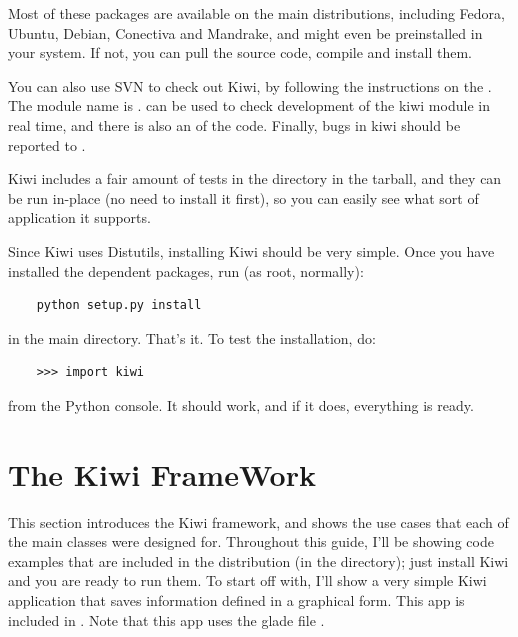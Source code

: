 \documentclass[a4paper]{howto}
\begin{document}
Most of these packages are available on the main distributions,
including Fedora, Ubuntu, Debian, Conectiva and Mandrake, and might even be
preinstalled in your system. If not, you can pull the source code,
compile and install them.

You can also use SVN to check out Kiwi, by following the instructions on
the . The module name is .
 can be used to check development of the kiwi module in
real time, and there is also an
 of the code.
Finally, bugs in kiwi should be reported to
.

Kiwi includes a fair amount of tests in the  directory in
the tarball, and they can be run in-place (no need to install it first),
so you can easily see what sort of application it supports.

Since Kiwi uses Distutils, installing Kiwi should be very simple.  Once
you have installed the dependent packages, run (as root, normally):


    \begin{verbatim}
    python setup.py install
    \end{verbatim}

in the main directory. That's it. To test the installation, do:

    \begin{verbatim}
    >>> import kiwi
    \end{verbatim}

from the Python console. It should work, and if it does, everything
is ready.

\section{The Kiwi FrameWork}
\label{person}

This section introduces the Kiwi framework, and shows the use cases that
each of the main classes were designed for. Throughout this guide, I'll
be showing code examples that are included in the distribution (in the
 directory); just install Kiwi and you are ready to run
them. To start off with, I'll show a very simple Kiwi application that
saves information defined in a graphical form. This app is included in
.  Note that this app uses the
glade file .
\end{document}
